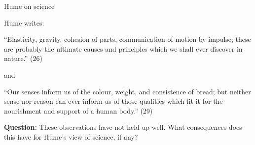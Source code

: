 \documentclass[8pt]{beamer}\usepackage[]{graphicx}\usepackage[]{color}
\begin{document}


\begin{frame}{Hume on science}

Hume writes:

\begin{addmargin}[2em]{2em}%
    ``Elasticity, gravity, cohesion of parts, communication of motion
    by impulse; these are probably the ultimate causes and principles
    which we shall ever discover in nature.'' (26)
\end{addmargin}

and

\begin{addmargin}[2em]{2em}%
    ``Our senses inform us of the colour, weight, and consistence of bread;
    but neither sense nor reason can ever inform us of those qualities
    which fit it for the nourishment and support of a human body.'' (29)
\end{addmargin}

\pause

\textbf{Question:}  These observations have not held up well.  What consequences
does this have for Hume's view of science, if any?

\end{frame}




\end{document}
